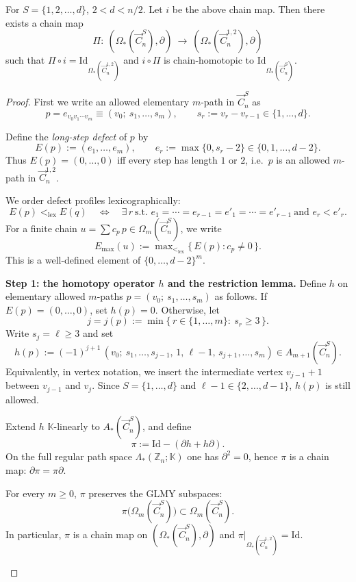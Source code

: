 \documentclass[10pt,a4paper]{amsart}
\newcommand{\K}{\mathbb K}
\newcommand{\Z}{\mathbb Z}
\begin{document}
\begin{theorem}\label{thm:S12d} 
For $S=\{1,2,\ldots,d\}$, $2<d<n/2$. Let $i$ be the above chain map.
Then there exists a chain map
\[
\Pi:\ \left(\Omega_*(\vec{C}_n^S),\partial\right)~\rightarrow~ \left(\Omega_*(\vec{C}_n^{1,2}),\partial\right)
\]
such that $\Pi\circ i=\mathrm{Id}_{\Omega_*(\vec{C}_n^{1,2})}$ and $i\circ\Pi$ is chain-homotopic to $\mathrm{Id}_{\Omega_*(\vec{C}_n^S)}$.
\end{theorem}

\begin{proof} 
First we write an allowed elementary $m$-path in $\vec{C}_n^S$ as
\[
p=e_{v_0v_1\cdots v_m}\equiv (v_0;~ s_1,\dots,s_m),
\qquad s_r:=v_r-v_{r-1}\in\{1,\dots,d\}.
\]

\medskip
Define the \emph{long-step defect} of $p$ by
\[
E(p):=(e_1,\dots,e_m),\qquad e_r:=\max\{0,s_r-2\}\in\{0,1,\dots,d-2\}.
\]
Thus $E(p)=(0,\dots,0)$ iff every step has length $1$ or $2$, i.e.\ $p$ is an allowed $m$-path in $\vec{C}_n^{1,2}$.

We order defect profiles lexicographically:
\[
E(p)<_{\mathrm{lex}}E(q)\quad\Longleftrightarrow\quad
\exists\,r\ \text{s.t. } e_1=\cdots=e_{r-1}=e'_1=\cdots=e'_{r-1}\ \text{and } e_r<e'_r.
\]
For a finite chain $u=\sum c_p\,p\in\Omega_m(\vec{C}_n^S)$, we write
\[
E_{\max}(u):=\max\nolimits_{<_{\mathrm{lex}}}\{\,E(p): c_p\neq 0\,\}.
\]
This is a well-defined element of $\{0,\dots,d-2\}^m$.

\medskip
\noindent\textbf{Step 1: the homotopy operator $h$ and the restriction lemma.}
Define $h$ on elementary allowed $m$-paths $p=(v_0;~s_1,\dots,s_m)$ as follows.
If $E(p)=(0,\dots,0)$, set $h(p)=0$.  Otherwise, let
\[
j=j(p):=\min\{\,r\in\{1,\dots,m\}:\ s_r\ge 3\,\}.
\]
Write $s_j=\ell\ge 3$ and set
\[
h(p):=(-1)^{j+1}\,(v_0;\ s_1,\dots,s_{j-1},\,1,\,\ell-1,\,s_{j+1},\dots,s_m)\in A_{m+1}(\vec{C}_n^S).
\]
Equivalently, in vertex notation, we insert the intermediate vertex $v_{j-1}+1$ between $v_{j-1}$ and $v_j$.
Since $S=\{1,\dots,d\}$ and $\ell-1\in\{2,\dots,d-1\}$, $h(p)$ is still allowed.

Extend $h$ $\K$-linearly to $A_*(\vec{C}_n^S)$, and define
\[
\pi:=\mathrm{Id}-(\partial h+h\partial).
\]
On the full regular path space $\Lambda_*(\Z_n;\K)$ one has $\partial^2=0$, hence $\pi$ is a chain map:
$\partial\pi=\pi\partial$.

\begin{lemma}
For every $m\ge 0$, $\pi$ preserves the GLMY subspaces:
\[
\pi\bigl(\Omega_m(\vec{C}_n^S)\bigr)\subset \Omega_m(\vec{C}_n^S).
\]
In particular, $\pi$ is a chain map on $(\Omega_*(\vec{C}_n^S),\partial)$ and $\pi|_{\Omega_*(\vec{C}_n^{1,2})}=\mathrm{Id}$.
\end{lemma}


\end{proof}
\end{document}
